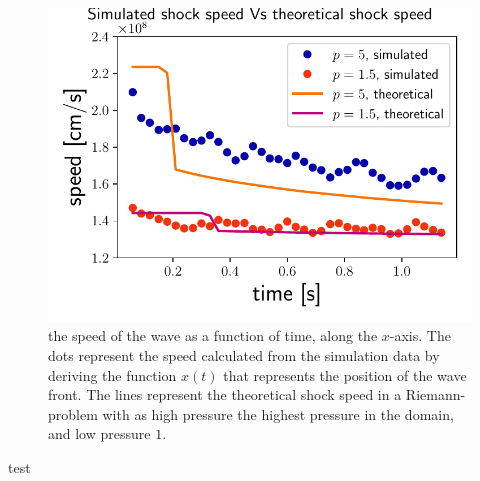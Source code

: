 \begin{figure}[H]
	\centering
	\includegraphics[width=\linewidth]{images/speed-time-hd.pdf}
	\caption{the speed of the wave as a function of time, along the $x$-axis. The dots represent the speed calculated from the simulation data by deriving the function $x(t)$ that represents the position of the wave front. The lines represent the theoretical shock speed in a Riemann-problem with as high pressure the highest pressure in the domain, and low pressure $1$.}
	\label{fig:}
\end{figure}


test
